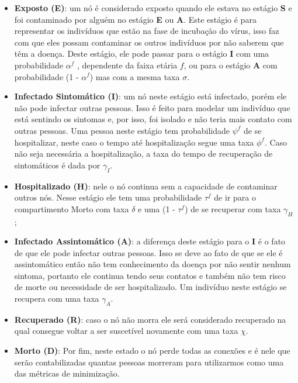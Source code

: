 \begin{itemize}
\begin{figure}[ht]
  \label{img:figinfect}
\end{figure}

  \item \textbf{Exposto (E)}: um nó é considerado exposto quando ele estava no estágio \textbf{S} e foi contaminado por alguém no estágio \textbf{E} ou \textbf{A}. Este estágio é para representar os indivíduos que estão na fase de incubação do vírus, isso faz com que eles possam contaminar os outros indivíduos por não saberem que têm a doença. Deste estágio, ele pode passar para o estágio \textbf{I} com uma probabilidade 
  $\alpha^f$%
, dependente da faixa etária $f$, 
  ou para o estágio \textbf{A} com probabilidade (1 - $\alpha^f$) mas com a mesma taxa $\sigma$.%
  
  \item \textbf{Infectado Sintomático (I)}: um nó neste estágio está infectado, porém ele não pode infectar outras pessoas. Isso é feito para modelar um indivíduo que está sentindo os sintomas e, por isso, foi isolado e não teria mais contato com outras pessoas. 
  Uma pessoa neste estágio tem probabilidade $\psi^f$ de se hospitalizar, neste caso o tempo até hospitalização segue uma taxa $\phi^f$. Caso não seja necessária a hospitalização, a taxa do tempo de recuperação de sintomáticos é dada por $\gamma_I$.%

  \item \textbf{Hospitalizado (H)}: nele o nó continua sem a capacidade de contaminar outros nós. Nesse estágio ele tem uma probabilidade $\tau^f$ de ir para o compartimento Morto com taxa $\delta$ e uma (1 - $\tau^f$) de se recuperar com taxa $\gamma_H$;
  
  \item \textbf{Infectado Assintomático (A)}: a diferença deste estágio para o \textbf{I} é o fato de que ele pode infectar outras pessoas. Isso se deve ao fato de que se ele é assintomático então não tem conhecimento da doença por não sentir nenhum sintoma, portanto ele continua tendo seus contatos e também não tem risco de morte ou necessidade de ser hospitalizado. Um indivíduo neste estágio se recupera com uma taxa $\gamma_A$.%
  
  \item \textbf{Recuperado (R)}: caso o nó não morra ele será considerado recuperado na qual consegue voltar a ser suscetível novamente com uma taxa $\chi$.%
  
  \item \textbf{Morto (D)}: Por fim, neste estado o nó perde todas as conexões e é nele que serão contabilizadas quantas pessoas morreram para utilizarmos como uma das métricas de minimização.
  
\end{itemize}

